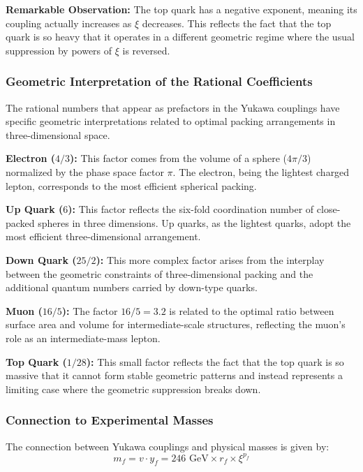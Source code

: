 \documentclass[12pt,a4paper]{article}
\begin{document}
	\textbf{Remarkable Observation:} The top quark has a negative exponent, meaning its coupling actually increases as $\xi$ decreases. This reflects the fact that the top quark is so heavy that it operates in a different geometric regime where the usual suppression by powers of $\xi$ is reversed.
	
	\subsubsection{Geometric Interpretation of the Rational Coefficients}
	
	The rational numbers that appear as prefactors in the Yukawa couplings have specific geometric interpretations related to optimal packing arrangements in three-dimensional space.
	
	\textbf{Electron ($4/3$):} This factor comes from the volume of a sphere ($4\pi/3$) normalized by the phase space factor $\pi$. The electron, being the lightest charged lepton, corresponds to the most efficient spherical packing.
	
	\textbf{Up Quark ($6$):} This factor reflects the six-fold coordination number of close-packed spheres in three dimensions. Up quarks, as the lightest quarks, adopt the most efficient three-dimensional arrangement.
	
	\textbf{Down Quark ($25/2$):} This more complex factor arises from the interplay between the geometric constraints of three-dimensional packing and the additional quantum numbers carried by down-type quarks.
	
	\textbf{Muon ($16/5$):} The factor $16/5 = 3.2$ is related to the optimal ratio between surface area and volume for intermediate-scale structures, reflecting the muon's role as an intermediate-mass lepton.
	
	\textbf{Top Quark ($1/28$):} This small factor reflects the fact that the top quark is so massive that it cannot form stable geometric patterns and instead represents a limiting case where the geometric suppression breaks down.
	
	\subsubsection{Connection to Experimental Masses}
	
	The connection between Yukawa couplings and physical masses is given by:
	\begin{equation}
		m_f = v \cdot y_f = 246 \text{ GeV} \times r_f \times \xi^{p_f}
	\end{equation}
	
\end{document}
